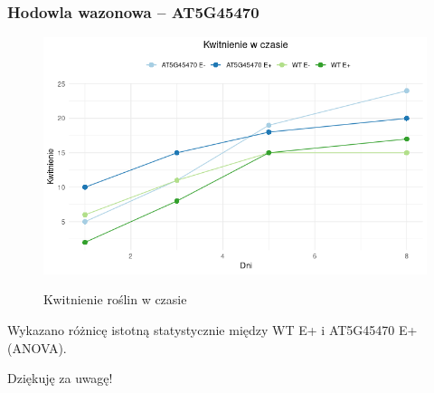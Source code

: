 \documentclass{beamer}
\begin{document}
\begin{frame}
    \frametitle{Hodowla wazonowa -- AT5G45470}
    \begin{figure}
        \centering
        \includegraphics[scale=0.5]{kwit1.png}\\
        \caption*\hfill{\scriptsize Kwitnienie roślin w czasie}%
    \end{figure}
    \small Wykazano różnicę istotną statystycznie między WT E+ i AT5G45470 E+ (ANOVA).
\end{frame}

\begin{frame}

    Dziękuję za uwagę!

\end{frame}
\end{document}
